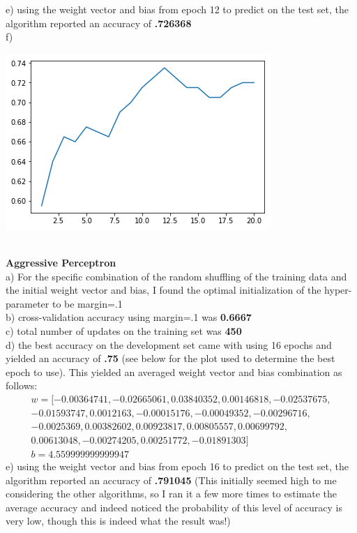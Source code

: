 \documentclass[11pt,a4paper]{article}
\begin{document}
\begin{enumerate}
			e) using the weight vector and bias from epoch 12 to predict on the test set, the algorithm reported an accuracy of \textbf{.726368} \\
			f)
			\begin{center}
				\includegraphics[width=0.7\linewidth]{average_plot}
			\end{center}
			~\\
			\textbf{Aggressive Perceptron}    \\
			a) For the specific combination of the random shuffling of the training data and the initial weight vector and bias, I found the optimal initialization of the hyper-parameter to be margin=.1  \\
			b) cross-validation accuracy using margin=.1 was \textbf{0.6667}\\
			c) total number of updates on the training set was \textbf{450}\\
			d) the best accuracy on the development set came with using 16 epochs and yielded an accuracy of \textbf{.75} (see below for the plot used to determine the best epoch to use). This yielded an averaged weight vector and bias combination as follows:\\
			\begin{gather}
			w = [-0.00364741, -0.02665061,  0.03840352,  0.00146818, -0.02537675,\\
         -0.01593747,  0.0012163 , -0.00015176, -0.00049352, -0.00296716,\\
         -0.0025369 ,  0.00382602,  0.00923817,  0.00805557,  0.00699792,\\
          0.00613048, -0.00274205,  0.00251772, -0.01891303]\\
			b = 4.559999999999947
			\end{gather}
			e) using the weight vector and bias from epoch 16 to predict on the test set, the algorithm reported an accuracy of \textbf{.791045} (This initially seemed high to me considering the other algorithms, so I ran it a few more times to estimate the average accuracy and indeed noticed the probability of this level of accuracy is very low, though this is indeed what the result was!)\\

\end{enumerate}
\end{document}
